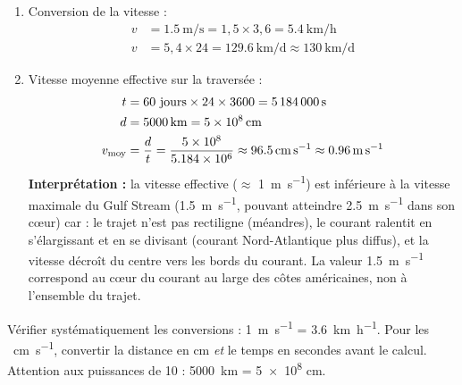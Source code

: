 \documentclass[11pt]{article}
\begin{document}
\begin{corrige}
\begin{enumerate}
    \item Conversion de la vitesse :
    \begin{align*}
    v &= \SI{1,5}{\meter\per\second} = 1,5 \times 3,6 = \SI{5,4}{\kilo\meter\per\hour}\\
    v &= 5,4 \times 24 = \SI{129,6}{\kilo\meter\per\day} \approx \SI{130}{\kilo\meter\per\day}
    \end{align*}
    \item Vitesse moyenne effective sur la traversée :
    \begin{align*}
    t &= 60 \text{ jours} \times 24 \times 3600 = \SI{5\,184\,000}{\second}\\
    d &= \SI{5000}{\kilo\meter} = \SI{5e8}{\centi\meter}\\
    v_{\text{moy}} &= \frac{d}{t} = \frac{\num{5e8}}{\num{5,184e6}} \approx \SI{96,5}{\centi\meter\per\second} \approx \SI{0,96}{\meter\per\second}
    \end{align*}
    \textbf{Interprétation :} la vitesse effective ($\approx$ \SI{1}{\meter\per\second}) est inférieure à la vitesse maximale du Gulf Stream (\SI{1,5}{\meter\per\second}, pouvant atteindre \SI{2,5}{\meter\per\second} dans son cœur) car : le trajet n'est pas rectiligne (méandres), le courant ralentit en s'élargissant et en se divisant (courant Nord-Atlantique plus diffus), et la vitesse décroît du centre vers les bords du courant. La valeur \SI{1,5}{\meter\per\second} correspond au cœur du courant au large des côtes américaines, non à l'ensemble du trajet.
\end{enumerate}
\end{corrige}

\begin{attention}
Vérifier systématiquement les conversions : \SI{1}{\meter\per\second} = \SI{3,6}{\kilo\meter\per\hour}. Pour les \SI{}{\centi\meter\per\second}, convertir la distance en cm \emph{et} le temps en secondes avant le calcul. Attention aux puissances de 10 : \SI{5000}{\kilo\meter} = \num{5e8} cm.
\end{attention}
\end{document}
